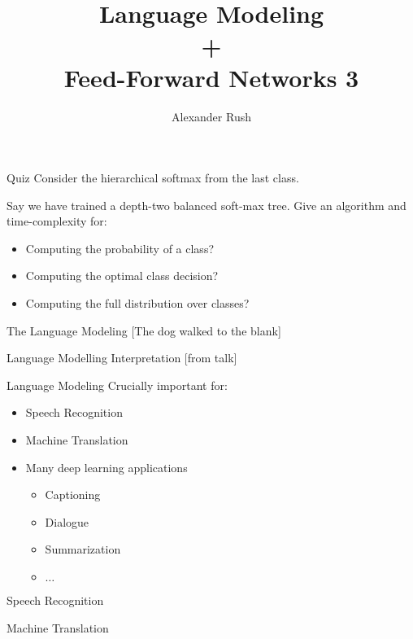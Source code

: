 \documentclass{beamer}
\title{Language Modeling \\ + \\ Feed-Forward Networks 3}
\date{}
\author{Alexander Rush}
\begin{document}
\begin{frame}
  \titlepage
\end{frame}

\begin{frame}{Quiz}
  Consider the hierarchical softmax from the last class.

  Say we have trained a depth-two balanced soft-max tree.
  Give an algorithm and time-complexity for:

  \begin{itemize}
  \item Computing the probability of a class?
  \item Computing the optimal class decision?
  \item Computing the full distribution over classes?
  \end{itemize}
\end{frame}


\begin{frame}{The Language Modeling }
  [The dog walked to the \alert{blank}]
\end{frame}

\begin{frame}{Language Modelling Interpretation}
  [from talk]
\end{frame}

\begin{frame}{Language Modeling}
  Crucially important for:

  \begin{itemize}
  \item Speech Recognition
  \item Machine Translation
  \item Many deep learning applications
    \begin{itemize}
    \item Captioning
    \item Dialogue
    \item Summarization
    \item $\dots$
    \end{itemize}
  \end{itemize}
\end{frame}

\begin{frame}{Speech Recognition }

\end{frame}

\begin{frame}{Machine Translation}

\end{frame}
\end{document}
